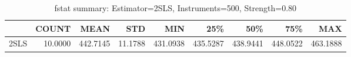 \begin{table}[ht]
\centering
\caption{fstat summary: Estimator=2SLS, Instruments=500, Strength=0.80}
\begin{tabular}{lrrrrrrrr}
\toprule
 & COUNT & MEAN & STD & MIN & 25\% & 50\% & 75\% & MAX \\
\midrule
2SLS & 10.0000 & 442.7145 & 11.1788 & 431.0938 & 435.5287 & 438.9441 & 448.0522 & 463.1888 \\
\bottomrule
\end{tabular}
\end{table}
